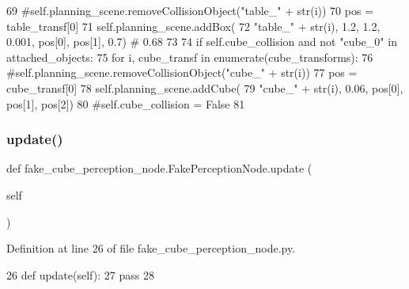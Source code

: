\begin{DoxyCode}
69                     \textcolor{comment}{#self.planning\_scene.removeCollisionObject("table\_" + str(i))}
70                     pos = table\_transf[0]
71                     self.planning\_scene.addBox(
72                         \textcolor{stringliteral}{"table\_"} + str(i), 1.2, 1.2, 0.001, pos[0],  pos[1],  0.7)  \textcolor{comment}{# 0.68}
73 
74             \textcolor{keywordflow}{if} self.cube\_collision \textcolor{keywordflow}{and} \textcolor{keywordflow}{not} \textcolor{stringliteral}{"cube\_0"} \textcolor{keywordflow}{in} attached\_objects:
75                 \textcolor{keywordflow}{for} i, cube\_transf \textcolor{keywordflow}{in} enumerate(cube\_transforms):
76                     \textcolor{comment}{#self.planning\_scene.removeCollisionObject("cube\_" + str(i))}
77                     pos = cube\_transf[0]
78                     self.planning\_scene.addCube(
79                         \textcolor{stringliteral}{"cube\_"} + str(i), 0.06, pos[0],  pos[1],  pos[2])
80                     \textcolor{comment}{#self.cube\_collision = False}
81 
\end{DoxyCode}
\mbox{\label{classfake__cube__perception__node_1_1FakePerceptionNode_ae73741e7f84f057cbf109698e70a2515}} 
\subsubsection{\texorpdfstring{update()}{update()}}
{\footnotesize\ttfamily def fake\+\_\+cube\+\_\+perception\+\_\+node.\+Fake\+Perception\+Node.\+update (\begin{DoxyParamCaption}\item[{}]{self }\end{DoxyParamCaption})}



Definition at line 26 of file fake\+\_\+cube\+\_\+perception\+\_\+node.\+py.


\begin{DoxyCode}
26     \textcolor{keyword}{def }update(self):
27         \textcolor{keywordflow}{pass}
28 
\end{DoxyCode}



